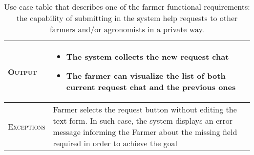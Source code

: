 \begin{table}[H]
\begin{tabular}{|l|p{}|}
    	\hline %
    	\textsc{Output}             &  \begin{itemize}
    	    \item The system collects the new request chat
    	    \item The farmer can visualize the list of both current request chat and the previous ones
    	\end{itemize}\\
    	\hline %
    	\textsc{Exceptions}         &  Farmer selects the request button without editing the text form. In such case, the system displays an error message informing the Farmer about the missing field required in order to achieve the goal\\
    	\hline %
        
    \end{tabular}
    \caption{\label{tab:Help_request_submission}Use case table that describes one of the farmer functional requirements: the capability of submitting in the system help requests to other farmers and/or agronomists in a private way.}

\end{table}

